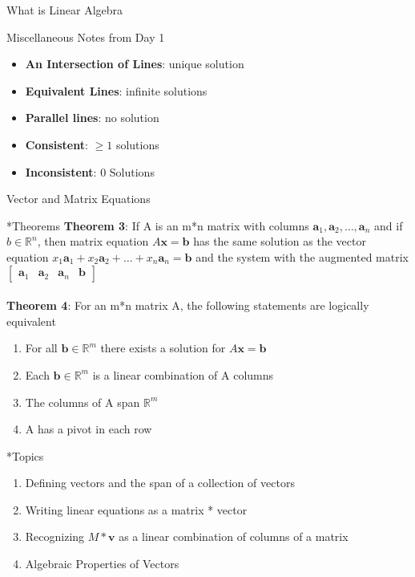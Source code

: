 \documentclass[a4paper, 12pt]{article}
\begin{document}
\begin{section}{What is Linear Algebra}
\begin{subsection}{Miscellaneous Notes from Day 1}
	\begin{itemize}
		\item{\textbf{An Intersection of Lines}:
			unique solution}
		\item{\textbf{Equivalent Lines}:
			infinite solutions}
		\item{\textbf{Parallel lines}: no solution}
		\item{\textbf{Consistent}: $\geq 1$ solutions}
		\item{\textbf{Inconsistent}: 0 Solutions}
	\end{itemize}
\end{subsection}

\end{section}	

\begin{section}{Vector and Matrix Equations}

\begin{subsection}*{Theorems}
\textbf{Theorem 3}: If A is an m*n matrix with columns
$\textbf{a}_1, \textbf{a}_2,\dots,\textbf{a}_n$ and if 
$b \in \mathbb{R}^n$, then matrix equation $A\textbf{x}=\textbf{b}$
has the same solution as the vector equation
$x_1\textbf{a}_1+x_2\textbf{a}_2+\dots+x_n\textbf{a}_n=\textbf{b}$
and the system with the augmented matrix 
$\begin{bmatrix} 
\textbf{a}_1 & \textbf{a}_2 & \textbf{a}_n & \textbf{b} \end{bmatrix}$ 
\\ \\
\textbf{Theorem 4}: For an m*n matrix A, the following statements
are logically equivalent
\begin{enumerate}
	\item{For all $\textbf{b}\in\mathbb{R}^m$ 
	there exists a solution for $A\textbf{x}=\textbf{b}$}
	\item{Each $\textbf{b}\in\mathbb{R}^m$ is a linear combination
		of A columns}
	\item{The columns of A span $\mathbb{R}^m$}
	\item{A has a pivot in each row}
\end{enumerate}
\end{subsection}
\begin{subsection}*{Topics}
\begin{enumerate}
	\item{Defining vectors and the span of a collection of vectors}
	\item{Writing linear equations as a matrix * vector}
	\item{Recognizing $M*\textbf{v}$ as a linear combination
		of columns of a matrix}
	\item{Algebraic Properties of Vectors}
\end{enumerate}
\end{subsection}


\end{section}
\end{document}
